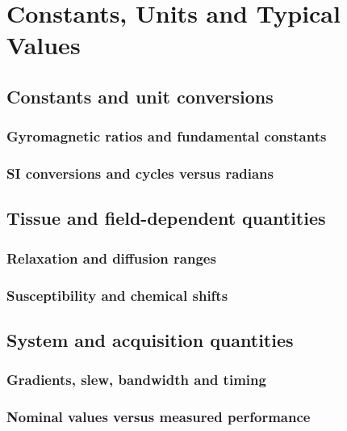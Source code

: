 \chapter{Constants, Units and Typical Values}
\label{app:d}

\section{Constants and unit conversions}
\label{sec:d:constants-and-unit-conversions}
\subsection{Gyromagnetic ratios and fundamental constants}
\subsection{SI conversions and cycles versus radians}

\section{Tissue and field-dependent quantities}
\label{sec:d:tissue-and-field-dependent-quantities}
\subsection{Relaxation and diffusion ranges}
\subsection{Susceptibility and chemical shifts}

\section{System and acquisition quantities}
\label{sec:d:system-and-acquisition-quantities}
\subsection{Gradients, slew, bandwidth and timing}
\subsection{Nominal values versus measured performance}
